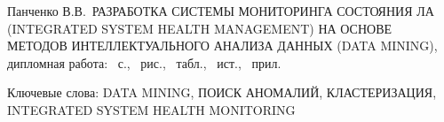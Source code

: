 \newcommand{\thesistitle}{Разработка системы мониторинга состояния ЛА (Integrated System Health Management) на основе методов интеллектуального анализа данных (Data Mining)}
\newcommand{\thesisauthor}{Панченко В.В.}
\newcommand{\thesiskeywords}{Data Mining, поиск аномалий, кластеризация, Integrated System Health Monitoring}

\protect{}
\sloppy
{
\thesisauthor\ \MakeUppercase{\thesistitle}, дипломная работа: \pagecount~с., ~рис., ~табл., ~ист., ~прил.

Ключевые слова: \MakeUppercase{\thesiskeywords}
}